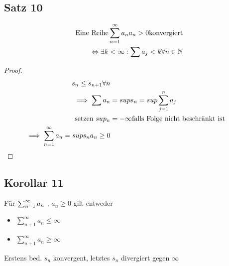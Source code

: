\subsection{Satz 10}
  \begin{equation}
    \begin{split}
      \text{Eine Reihe} \sum_{n=1}^{\infty} a_n a_n>0 \text{konvergiert} \\
      \Leftrightarrow \exists k < \infty : \sum a_j < k \forall n \in \mathbb{N}
    \end{split}
  \end{equation}
  \begin{proof}
    \begin{equation}
      \begin{split}
	s_n \le s_{n+1} \forall n \\
	\implies \sum a_n &= sup s_n = sup \sum_{j=1}^{n} a_j \\
	\text{setzen }sup_n &= -\infty \text{falls Folge nicht beschränkt ist} \\
	\implies \sum_{n=1}^{\infty} a_n = sup s_n a_n \ge 0
      \end{split}
    \end{equation}
  \end{proof}

\subsection{Korollar 11}
  Für $\sum_{n=1}^{\infty} a_n $ , $a_n \ge 0$ gilt entweder
  \begin{itemize}
    \item $\sum_{n+1}^{\infty} a_n \le \infty$
    \item $\sum_{n+1}^{\infty} a_n \ge \infty$
  \end{itemize}
  Erstens bed. $s_n$ konvergent, letztes $s_n$ divergiert gegen $\infty$

